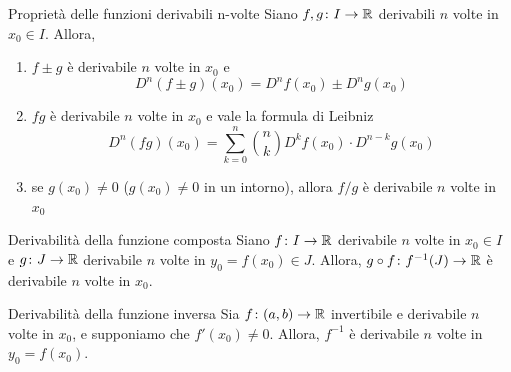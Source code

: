 \documentclass[a4paper]{article}
\begin{document}
\begin{snippetproposition}{Proprietà delle funzioni derivabili n-volte}
    Siano \(f,g \colon I \to \mathbb{R}\) derivabili \(n\) volte in \(x_0 \in I\).
    Allora,
    \begin{enumerate}
        \item \(f\pm g\) è derivabile \(n\) volte in \(x_0\) e
        \[
            D^n(f\pm g)(x_0) = D^n f(x_0) \pm D^n g(x_0)
        \]
        \item \(fg\) è derivabile \(n\) volte in \(x_0\) e vale la formula di Leibniz
        \[
            D^n(fg)(x_0) = \sum_{k=0}^n \binom{n}{k}
            D^k f(x_0) \cdot D^{n-k} g(x_0)
        \]
        \item se \(g(x_0) \neq 0\) (\(g(x_0) \neq 0\) in un intorno), allora
        \(f/g\) è derivabile \(n\) volte in \(x_0\)
    \end{enumerate}
\end{snippetproposition}

\begin{snippetproposition}{Derivabilità della funzione composta}
    Siano \(f\colon I \to \mathbb{R}\) derivabile \(n\) volte
    in \(x_0 \in I\) e \(g\colon J \to \mathbb{R}\) derivabile \(n\)
    volte in \(y_0 = f(x_0) \in J\).
    Allora,
    \(g\circ f \colon f^{-1}(J) \to \mathbb{R}\) è derivabile \(n\) volte
    in \(x_0\).
\end{snippetproposition}

\begin{snippetproposition}{Derivabilità della funzione inversa}
    Sia \(f\colon (a,b) \to \mathbb{R}\) invertibile e derivabile \(n\) volte in \(x_0\),
    e supponiamo che \(f'(x_0)\neq 0\).
    Allora, \(f^{-1}\) è derivabile \(n\) volte in \(y_0 = f(x_0)\).
\end{snippetproposition}

\end{document}
